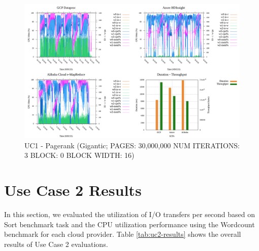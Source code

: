 \documentclass[review]{elsarticle}
\begin{document}
	\begin{figure}[p]
		\caption{UC1 - Pagerank (Gigantic; PAGES: 30,000,000 NUM ITERATIONS: 3 BLOCK: 0 BLOCK WIDTH: 16)}
		\label{fig:uc1-page-g-cmidt}
		\includegraphics[width=\textwidth]{uc1-page-g-cmidt}
		\centering
	\end{figure}
	
	
	
	\section{Use Case 2 Results}
	In this section, we evaluated the utilization of I/O transfers per second based on Sort benchmark task and the CPU utilization performance using the Wordcount benchmark for each cloud provider. Table \ref{tab:uc2-results} shows the overall results of Use Case 2 evaluations.
	
\end{document}
